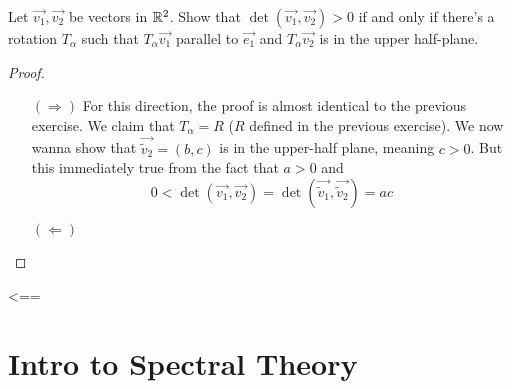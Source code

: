 \begin{exercise}
  Let $\vec{v_1},\vec{v_2}$ be vectors in $\R^2$. Show that 
  $\det(\vec{v_1},\vec{v_2})>0$ if and only if there's a rotation
  $T_{\alpha}$ such that $T_{\alpha}\vec{v_1}$ parallel to $\vec{e_1}$
  and $T_{\alpha}\vec{v_2}$ is in the upper half-plane.
\end{exercise}
\begin{proof}
  \text{}
  \begin{itemize}
    \item[$(\Rightarrow)$] For this direction, the proof is almost 
      identical to the previous exercise. We claim that 
      $T_{\alpha}=R$ ($R$ defined in the previous exercise).
      We now wanna show that $\vec{\tilde{v}_2}=(b,c)$ is in the 
      upper-half plane, meaning $c>0$. But this immediately true 
      from the fact that $a>0$ and
      \[
        0<\det(\vec{v_1},\vec{v_2})=
        \det(\vec{\tilde{v}_1},\vec{\tilde{v}_2})=ac
      \]
    \item[$(\Leftarrow)$]
  \end{itemize}
\end{proof}
<==
\chapter{Intro to Spectral Theory}

